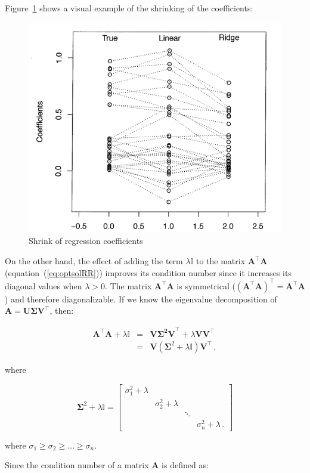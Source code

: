 Figure~\ref{fig:shrinks} shows a visual example of the shrinking of the
coefficients:

\begin{figure}[h!]
\includegraphics[width=0.5\linewidth]{img/shrinks}
\caption{Shrink of regression coefficients}
\label{fig:shrinks}
\end{figure}



On the other hand, the effect of adding the term $\lambda \mathbb{I}$
to the matrix $\mathbf{A}^\top \mathbf{A}$
(equation~(\ref{eq:optsolRR})) improves its condition number since it
increases its diagonal values when $\lambda > 0 $.  The matrix
$\mathbf{A}^\top \mathbf{A}$ is symmetrical ($(\mathbf{A}^\top
\mathbf{A})^\top = \mathbf{A}^\top \mathbf{A}$) and therefore
diagonalizable.  If we know the eigenvalue decomposition of $\mathbf{A}
= \mathbf{U\Sigma V^\top}$, then:

\begin{eqnarray*}
\mathbf{A}^\top \mathbf{A}+\lambda \mathbb{I}&=&\mathbf{V\Sigma^2
V}^\top + \lambda \mathbf{V} \mathbf{V}^\top\\ &=&\mathbf{V}
(\mathbf{\Sigma}^2+\lambda\mathbb{I}) \mathbf{V}^\top \, ,
\end{eqnarray*}

\noindent where

\begin{equation*}
\mathbf{\Sigma}^2+\lambda\mathbb{I}=
\begin{bmatrix}
\sigma^2_1 + \lambda & \, & \, \\
\, & \sigma^2_2 +\lambda & \, \\
\, & \, & \ddots & \, \\
\, & \, & \, & \sigma^2_n +\lambda \, .
\end{bmatrix}
\end{equation*}

where $\sigma_1 \geq \sigma_2 \geq \dots \geq \sigma_n$.

Since the condition number of a matrix $\mathbf{A}$ is defined as:

